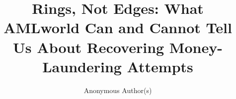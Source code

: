 \documentclass[sigconf,review,anonymous]{acmart}
\begin{document}
\title{Rings, Not Edges: What AMLworld Can and Cannot Tell Us
About Recovering Money-Laundering Attempts}

\author{Anonymous Author(s)}


\maketitle











\appendix

\end{document}
